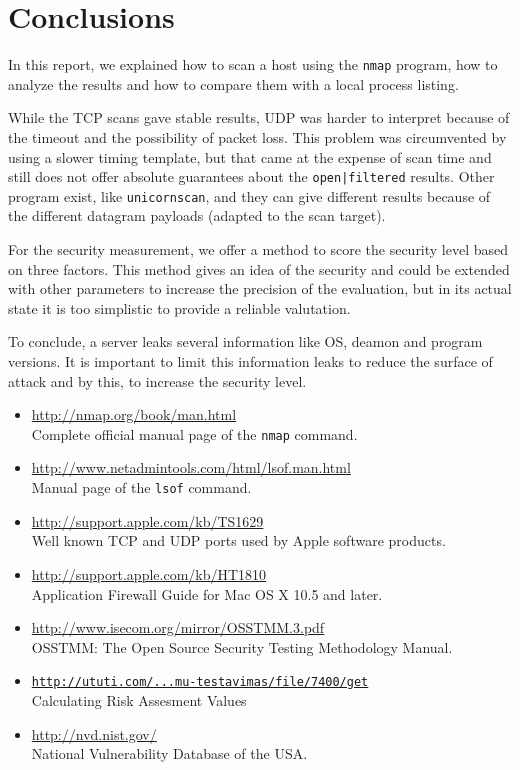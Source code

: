 \documentclass[10pt,a4paper,twoside,onecolumn]{article}
\begin{document}
\section{Conclusions}

In this report, we explained how to scan a host using the \texttt{nmap} program, how to analyze the results and how to compare them with a local process listing.

While the TCP scans gave stable results, UDP was harder to interpret because of the timeout and the possibility of packet loss. This problem was circumvented by using a slower timing template, but that came at the expense of scan time and still does not offer absolute guarantees about the \texttt{open|filtered} results. Other program exist, like \texttt{unicornscan}, and they can give different results because of the different datagram payloads (adapted to the scan target).

For the security measurement, we offer a method to score the security level based on three factors. This method gives an idea of the security and could be extended with other parameters to increase the precision of the evaluation, but in its actual state it is too simplistic to provide a reliable valutation.

To conclude, a server leaks several information like OS, deamon and program versions. It is important to limit this information leaks to reduce the surface of attack and by this, to increase the security level.

\clearpage
{}

\begin{itemize}
	\item \url{http://nmap.org/book/man.html}\\Complete official manual page of the \texttt{nmap} command.
	\item \url{http://www.netadmintools.com/html/lsof.man.html}\\Manual page of the \texttt{lsof} command.
	\item \url{http://support.apple.com/kb/TS1629}\\Well known TCP and UDP ports used by Apple software products.
	\item \url{http://support.apple.com/kb/HT1810}\\Application Firewall Guide for Mac OS X 10.5 and later.
	\item \url{http://www.isecom.org/mirror/OSSTMM.3.pdf}\\OSSTMM: The Open Source Security Testing Methodology Manual.
	\item \href{http://ututi.com/subject/vu/mif/programu-sistemu-testavimas/file/7400/get}{\texttt{http://ututi.com/...mu-testavimas/file/7400/get}}\\Calculating Risk Assesment Values
	\item \url{http://nvd.nist.gov/}\\National Vulnerability Database of the USA.
\end{itemize}
\end{document}
